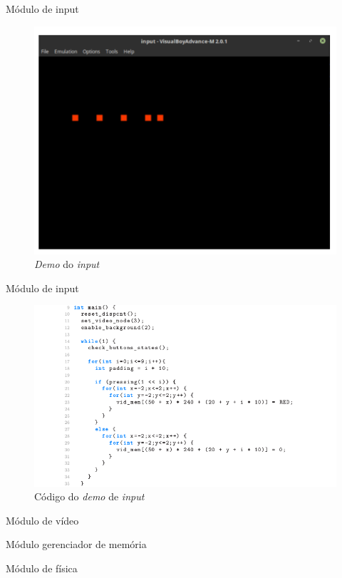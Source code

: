 \documentclass[notes, mathserif]{beamer}
\begin{document}
\begin{frame}{M\'odulo de input}
	\begin{figure}[H]
		\includegraphics[width=.7\linewidth]{figuras/input-demo.png}
		\centering
		\caption{\textit{Demo} do \textit{input}}
		\label{fig:inputdemo}
	\end{figure}
\end{frame}

\begin{frame}{M\'odulo de input}
	\begin{figure}[H]
		\includegraphics[width=.9\linewidth]{figuras/input-demo-codigo.png}
		\centering
		\caption{C\'odigo do \textit{demo} de \textit{input}}
		\label{fig:inputdemocode}
	\end{figure}
\end{frame}

\begin{frame}{M\'odulo de v\'ideo}
\end{frame}

\begin{frame}{M\'odulo gerenciador de mem\'oria}
\end{frame}

\begin{frame}{M\'odulo de f\'isica}
\end{frame}
\end{document}
